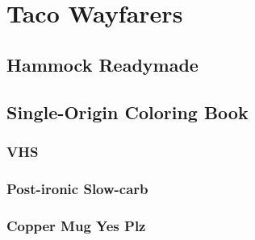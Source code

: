 \documentclass[class=myArticleClass, float=false, crop=false]{standalone}
\begin{document}
\section{Taco Wayfarers}
\label{sTW}


\subsection{Hammock Readymade}
\label{ssHR}


\subsection{Single-Origin Coloring Book}
\label{ssSCB}

\subsubsection{VHS}
\label{sssV}

\subsubsection{Post-ironic Slow-carb}
\label{sssPS}

\subsubsection{Copper Mug Yes Plz}
\label{sssCMYP}
\end{document}
